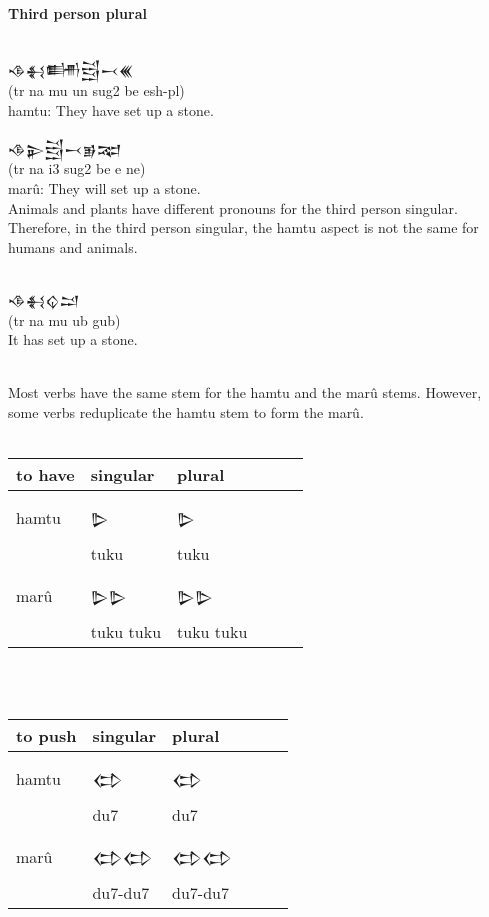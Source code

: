 \documentclass[a4paper,12pt]{book}
\newcommand{\fcm}{\large\setmainfont{Akkadian.otf}}
\begin{document}
\paragraph{Third person plural}\verb||\\
{\fcm 𒈾𒈬𒌦𒁻𒁁𒌍}\\
(tr na mu un sug2 be esh-pl)\\
hamtu: They have set up a stone.\\

\verb||\\
{\fcm 𒈾𒉌𒁻𒁁𒂊𒉈}\\
(tr na i3 sug2 be e ne)\\
marû: They will set up a stone.\\

\newpage
Animals and plants have different pronouns
for the third person singular. Therefore,
in the third person singular, the hamtu aspect
is not the same for humans and animals.

\verb||\\
{\fcm 𒈾𒈬𒌒𒁺}\\
(tr na mu ub gub)\\
It has set up a stone.

\verb||\\
Most verbs have the same stem for the hamtu
and the marû stems. However, some verbs reduplicate
the hamtu stem to form the marû.\\

\verb||\\
\begin{tabular}[!h]{l | l l l l l}
  to have & singular & plural\\
  \hline\\
  hamtu   &\fcm 𒌇 &\fcm 𒌇\\
  & tuku    & tuku\\
  \hline\\
  marû &\fcm 𒌇𒌇 &\fcm 𒌇𒌇\\
       & tuku tuku    & tuku tuku\\
\end{tabular}\verb||\\

\verb||\\
\begin{tabular}[!h]{l | l l l l l}
  to push & singular & plural\\
  \hline\\
  hamtu   &\fcm 𒌌 &\fcm 𒌌\\
  & du7    & du7\\
  \hline\\
  marû &\fcm 𒌌𒌌 &\fcm 𒌌𒌌\\
       & du7-du7     & du7-du7\\
\end{tabular}\verb||\\
\end{document}
